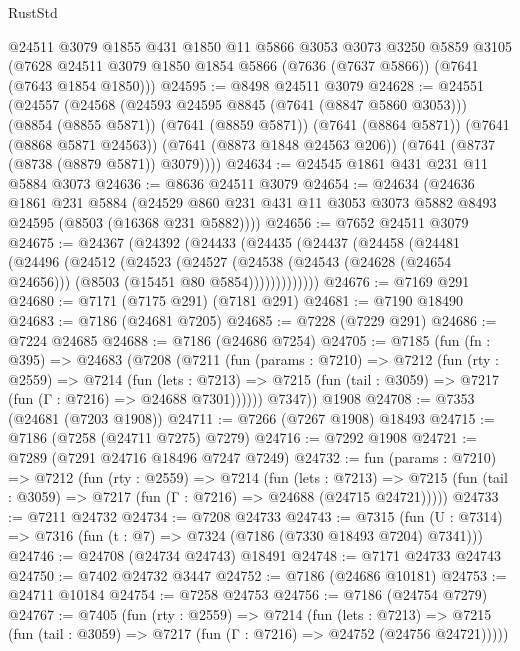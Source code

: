 \begin{lexlean}{RustStd}
\begin{coremodule}
    @24511
    @3079
    @1855
    @431
    @1850
    @11
    @5866
    @3053
    @3073
    @3250
    @5859
    @3105
    (@7628 @24511 @3079 @1850 @1854 @5866 (@7636 (@7637 @5866)) (@7641 (@7643 @1854 @1850)))
@24595 := @8498 @24511 @3079
@24628 := @24551
    (@24557
      (@24568
        (@24593 @24595 @8845 (@7641 (@8847 @5860 @3053)))
        (@8854 (@8855 @5871))
        (@7641 (@8859 @5871))
        (@7641 (@8864 @5871))
        (@7641 (@8868 @5871 @24563))
        (@7641 (@8873 @1848 @24563 @206))
        (@7641 (@8737 (@8738 (@8879 @5871)) @3079))))
@24634 := @24545 @1861 @431 @231 @11 @5884 @3073
@24636 := @8636 @24511 @3079
@24654 := @24634
    (@24636
      @1861
      @231
      @5884
      (@24529 @860 @231 @431 @11 @3053 @3073 @5882 @8493 @24595 (@8503 (@16368 @231 @5882))))
@24656 := @7652 @24511 @3079
@24675 := @24367
    (@24392
      (@24433
        (@24435
          (@24437
            (@24458
              (@24481
                (@24496
                  (@24512
                    (@24523
                      (@24527
                        (@24538
                          (@24543 (@24628 (@24654 @24656)))
                          (@8503 (@15451 @80 @5854)))))))))))))
@24676 := @7169 @291
@24680 := @7171 (@7175 @291) (@7181 @291)
@24681 := @7190 @18490
@24683 := @7186 (@24681 @7205)
@24685 := @7228 (@7229 @291)
@24686 := @7224 @24685
@24688 := @7186 (@24686 @7254)
@24705 := @7185
    (fun (fn : @395) =>
    @24683
      (@7208
        (@7211
          (fun (params : @7210) =>
          @7212
            (fun (rty : @2559) =>
            @7214
              (fun (lets : @7213) =>
              @7215 (fun (tail : @3059) => @7217 (fun (Γ : @7216) => @24688 @7301))))))
        @7347))
    @1908
@24708 := @7353 (@24681 (@7203 @1908))
@24711 := @7266 (@7267 @1908) @18493
@24715 := @7186 (@7258 (@24711 @7275) @7279)
@24716 := @7292 @1908
@24721 := @7289 (@7291 @24716 @18496 @7247 @7249)
@24732 := fun (params : @7210) =>
  @7212
    (fun (rty : @2559) =>
    @7214
      (fun (lets : @7213) =>
      @7215 (fun (tail : @3059) => @7217 (fun (Γ : @7216) => @24688 (@24715 @24721)))))
@24733 := @7211 @24732
@24734 := @7208 @24733
@24743 := @7315
    (fun (U : @7314) => @7316 (fun (t : @7) => @7324 (@7186 (@7330 @18493 @7204) @7341)))
@24746 := @24708 (@24734 @24743) @18491
@24748 := @7171 @24733 @24743
@24750 := @7402 @24732 @3447
@24752 := @7186 (@24686 @10181)
@24753 := @24711 @10184
@24754 := @7258 @24753
@24756 := @7186 (@24754 @7279)
@24767 := @7405
    (fun (rty : @2559) =>
    @7214
      (fun (lets : @7213) =>
      @7215 (fun (tail : @3059) => @7217 (fun (Γ : @7216) => @24752 (@24756 @24721)))))

\end{coremodule}
\end{lexlean}
